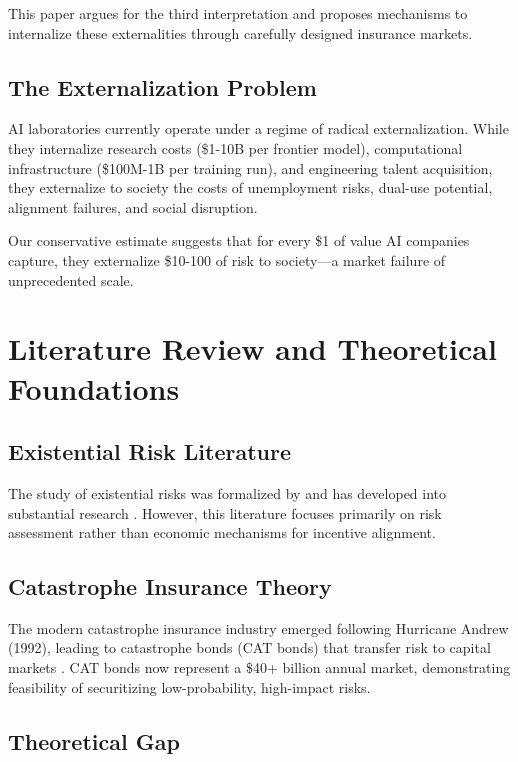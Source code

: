 \documentclass[11pt]{article}
\begin{document}
This paper argues for the third interpretation and proposes mechanisms to internalize these externalities through carefully designed insurance markets.

\subsection{The Externalization Problem}

AI laboratories currently operate under a regime of radical externalization. While they internalize research costs (\$1-10B per frontier model), computational infrastructure (\$100M-1B per training run), and engineering talent acquisition, they externalize to society the costs of unemployment risks, dual-use potential, alignment failures, and social disruption.

Our conservative estimate suggests that for every \$1 of value AI companies capture, they externalize \$10-100 of risk to society---a market failure of unprecedented scale.

\section{Literature Review and Theoretical Foundations}

\subsection{Existential Risk Literature}

The study of existential risks was formalized by \citet{bostrom2002existential} and has developed into substantial research \citep{ord2020precipice, yudkowsky2008ai}. However, this literature focuses primarily on risk assessment rather than economic mechanisms for incentive alignment.

\subsection{Catastrophe Insurance Theory}

The modern catastrophe insurance industry emerged following Hurricane Andrew (1992), leading to catastrophe bonds (CAT bonds) that transfer risk to capital markets \citep{cummins2009convergence}. CAT bonds now represent a \$40+ billion annual market, demonstrating feasibility of securitizing low-probability, high-impact risks.

\subsection{Theoretical Gap}
\end{document}
